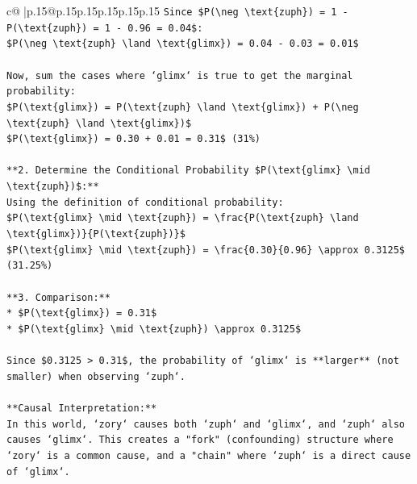 \documentclass{article}
\begin{document}
{\begin{supertabular}{c@{$\;$}|p{.15\linewidth}@{}p{.15\linewidth}p{.15\linewidth}p{.15\linewidth}p{.15\linewidth}p{.15\linewidth}}
{{{\texttt{Since \$P(\textbackslash{}neg \textbackslash{}text\{zuph\}) = 1 {-} P(\textbackslash{}text\{zuph\}) = 1 {-} 0.96 = 0.04\$:} \\
\texttt{\$P(\textbackslash{}neg \textbackslash{}text\{zuph\} \textbackslash{}land \textbackslash{}text\{glimx\}) = 0.04 {-} 0.03 = 0.01\$} \\
\\ 
\texttt{Now, sum the cases where `glimx` is true to get the marginal probability:} \\
\texttt{\$P(\textbackslash{}text\{glimx\}) = P(\textbackslash{}text\{zuph\} \textbackslash{}land \textbackslash{}text\{glimx\}) + P(\textbackslash{}neg \textbackslash{}text\{zuph\} \textbackslash{}land \textbackslash{}text\{glimx\})\$} \\
\texttt{\$P(\textbackslash{}text\{glimx\}) = 0.30 + 0.01 = 0.31\$ (31\%)} \\
\\ 
\texttt{**2. Determine the Conditional Probability \$P(\textbackslash{}text\{glimx\} \textbackslash{}mid \textbackslash{}text\{zuph\})\$:**} \\
\texttt{Using the definition of conditional probability:} \\
\texttt{\$P(\textbackslash{}text\{glimx\} \textbackslash{}mid \textbackslash{}text\{zuph\}) = \textbackslash{}frac\{P(\textbackslash{}text\{zuph\} \textbackslash{}land \textbackslash{}text\{glimx\})\}\{P(\textbackslash{}text\{zuph\})\}\$} \\
\texttt{\$P(\textbackslash{}text\{glimx\} \textbackslash{}mid \textbackslash{}text\{zuph\}) = \textbackslash{}frac\{0.30\}\{0.96\} \textbackslash{}approx 0.3125\$ (31.25\%)} \\
\\ 
\texttt{**3. Comparison:**} \\
\texttt{*   \$P(\textbackslash{}text\{glimx\}) = 0.31\$} \\
\texttt{*   \$P(\textbackslash{}text\{glimx\} \textbackslash{}mid \textbackslash{}text\{zuph\}) \textbackslash{}approx 0.3125\$} \\
\\ 
\texttt{Since \$0.3125 > 0.31\$, the probability of `glimx` is **larger** (not smaller) when observing `zuph`.} \\
\\ 
\texttt{**Causal Interpretation:**} \\
\texttt{In this world, `zory` causes both `zuph` and `glimx`, and `zuph` also causes `glimx`. This creates a "fork" (confounding) structure where `zory` is a common cause, and a "chain" where `zuph` is a direct cause of `glimx`.} \\
}}}
\end{supertabular}}
\end{document}
